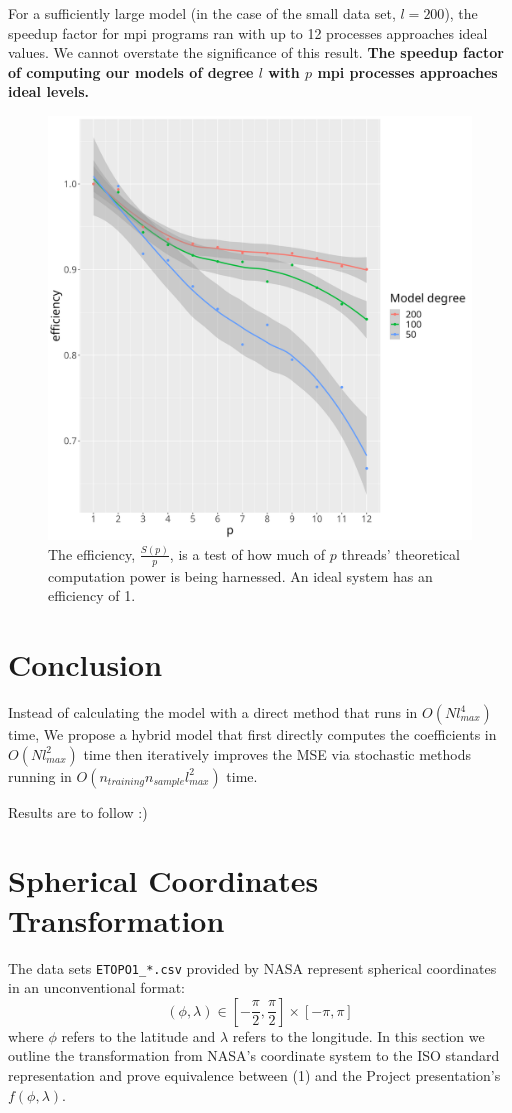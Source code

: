 \documentclass[a4paper]{article}
\theoremstyle{definition}
\begin{document}
For a sufficiently large model (in the case of the small data set, $l = 200$), the speedup factor for mpi programs ran with up to 12 processes approaches ideal values. We cannot
overstate the significance of this result. \textbf{The speedup factor of computing our models of degree $l$ with $p$ mpi processes approaches ideal levels.}

\begin{figure}
    \centering
    \includegraphics[width=0.5\linewidth]{media/mpi_efficieny.png}
    \caption{The efficiency, $\frac{S(p)}{p}$, is a test of how much of $p$ threads' theoretical computation power is
    being harnessed. An ideal system has an efficiency of 1.}

\end{figure}

\section{Conclusion}

Instead of calculating the model with a direct method that runs in $O(Nl_{max}^4)$ time, We propose a hybrid model that first directly computes the coefficients in $O(Nl_{max}^2)$ time then 
iteratively improves the MSE via stochastic methods running in $O(n_{training}n_{sample}l_{max}^2)$ time.

Results are to follow :)





\appendix
\section{Spherical Coordinates Transformation}

The data sets \verb|ETOPO1_*.csv| provided by NASA represent spherical coordinates in an unconventional format: $$(\phi, \lambda) \in [-\frac{\pi}{2}, \frac{\pi}{2}] \times [-\pi, \pi] $$ where $\phi$ refers to the latitude
and $\lambda$ refers to the longitude. In this section we outline the transformation from NASA's coordinate system to the ISO standard representation and prove equivalence between (1) and the Project presentation's $f(\phi, \lambda)$.
\end{document}
